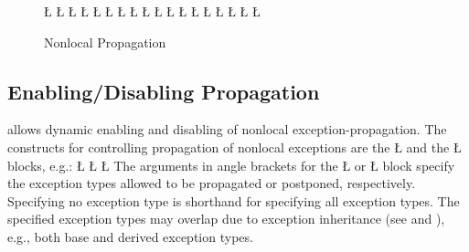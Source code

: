 \documentclass[openright,twoside]{report}
\begin{document}
\begin{figure}[htb]
\LGinlinefalse\LGbegin\lgrinde
\L{}
\L{}
\L{\LB{}}
\L{\LB{}}
\L{\LB{}}
\CE{}\L{\LB{}}
\L{\LB{}}
\CE{}\L{\LB{}}
\L{\LB{}}
\L{}
\L{\LB{}}
\CE{}\L{\LB{}}
\L{\LB{\};}}
\L{}
\L{\LB{}}
\L{\LB{}}
\CE{}\L{\LB{}}
\CE{}\L{\LB{\}}}
\endlgrinde\LGend
\vspace{-4mm}
\caption{Nonlocal Propagation}
\label{f:NonlocalPropagation}
\end{figure}


\subsection{Enabling/Disabling Propagation}
\label{s:EnablingDisablingPropagation}

\uC allows dynamic enabling and disabling of nonlocal exception-propagation.
The constructs for controlling propagation of nonlocal exceptions are the \LGinlinetrue\LGbegin\lgrinde\L{}\endlgrinde\LGend{} and the \LGinlinetrue\LGbegin\lgrinde\L{}\endlgrinde\LGend{} blocks, e.g.:
\LGinlinefalse\LGbegin\lgrinde
\L{}
\L{\LB{}}
\CE{}\L{\LB{\}}}
\endlgrinde\LGend
The arguments in angle brackets for the \LGinlinetrue\LGbegin\lgrinde\L{}\endlgrinde\LGend{} or \LGinlinetrue\LGbegin\lgrinde\L{}\endlgrinde\LGend{} block specify the exception types allowed to be propagated or postponed, respectively.
Specifying no exception type is shorthand for specifying all exception types.
The specified exception types may overlap due to exception inheritance (see  and ), e.g., both base and derived exception types.
\end{document}
